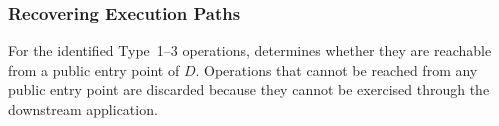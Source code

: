%












\subsubsection{Recovering Execution Paths}\label{subsubsec:downpath}
For the identified Type~1--3 operations, \sys determines whether they are reachable from a public entry point of $D$. Operations that cannot be reached from any public entry point are discarded because they cannot be exercised through the downstream application.



\begin{center}
    \setlength{\fboxsep}{0.4em}
    \noindent{}
\end{center}

